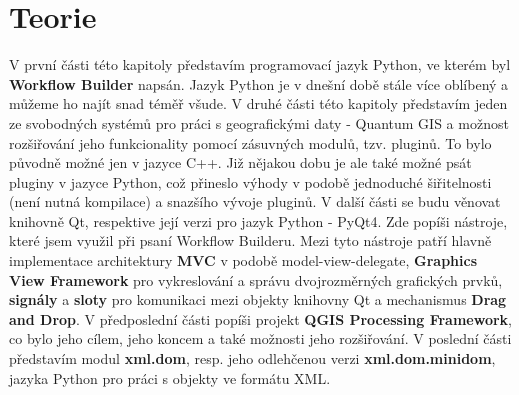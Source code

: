 \chapter{Teorie}
V první části této kapitoly představím programovací jazyk Python, ve kterém byl \textbf{Workflow Builder} napsán. Jazyk Python je v dnešní době stále více oblíbený a můžeme ho najít snad téměř všude. V druhé části této kapitoly představím jeden ze svobodných systémů pro práci s geografickými daty - Quantum GIS a možnost rozšiřování jeho funkcionality pomocí zásuvných modulů, tzv. pluginů. To bylo původně možné jen v jazyce C++. Již nějakou dobu je ale také možné psát pluginy v jazyce Python, což přineslo výhody v podobě jednoduché šiřitelnosti (není nutná kompilace) a snazšího vývoje pluginů. V další části se budu věnovat knihovně Qt, respektive její verzi pro jazyk Python - PyQt4. Zde popíši nástroje, které jsem využil při psaní Workflow Builderu. Mezi tyto nástroje patří hlavně implementace architektury \textbf{MVC} v podobě model-view-delegate, \textbf{Graphics View Framework} pro vykreslování a správu dvojrozměrných grafických prvků, \textbf{signály} a \textbf{sloty} pro komunikaci mezi objekty knihovny Qt a mechanismus \textbf{Drag and Drop}. V předposlední části popíši projekt \textbf{QGIS Processing Framework}, co bylo jeho cílem, jeho koncem a také možnosti jeho rozšiřování.  V poslední části představím modul \textbf{xml.dom}, resp. jeho odlehčenou verzi \textbf{xml.dom.minidom}, jazyka Python pro práci s objekty ve formátu XML.

\newpage




